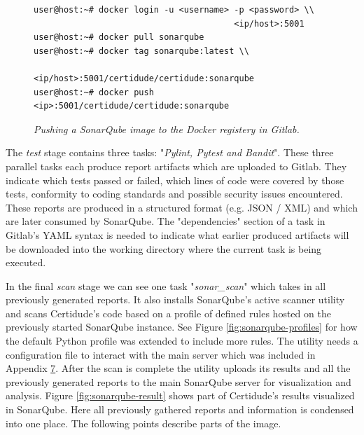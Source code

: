 \pagebreak

\begin{figure}[H]
\centering
\begin{lstlisting}[frame=single, basicstyle=\small, linewidth=\textwidth]
user@host:~# docker login -u <username> -p <password> \\ 
                                        <ip/host>:5001
user@host:~# docker pull sonarqube
user@host:~# docker tag sonarqube:latest \\
                    <ip/host>:5001/certidude/certidude:sonarqube
user@host:~# docker push <ip>:5001/certidude/certidude:sonarqube
\end{lstlisting}
\caption{\textit{Pushing a SonarQube image to the Docker registery in Gitlab.}}
\label{fig:gitlab-sonar-docker}
\end{figure}

The \textit{test} stage contains three tasks: "\textit{Pylint, Pytest and Bandit}". These three parallel tasks each produce report artifacts which are uploaded to Gitlab. They indicate which tests passed or failed, which lines of code were covered by those tests, conformity to coding standards and possible security issues encountered. These reports are produced in a structured format (e.g. JSON / XML) and which are later consumed by SonarQube. The "dependencies" section of a task in Gitlab's YAML syntax is needed to indicate what earlier produced artifacts will be downloaded into the working directory where the current task is being executed.

In the final \textit{scan} stage we can see one task "\textit{sonar\_scan}" which takes in all previously generated reports. It also installs SonarQube's active scanner utility and scans Certidude's code based on a profile of defined rules hosted on the previously started SonarQube instance. See Figure \ref{fig:sonarqube-profiles} for how the default Python profile was extended to include more rules. The utility needs a configuration file to interact with the main server which was included in Appendix \hyperref[chapter:appendix-sonar]{7}. After the scan is complete the utility uploads its results and all the previously generated reports to the main SonarQube server for visualization and analysis. Figure \ref{fig:sonarqube-result} shows part of Certidude's results visualized in SonarQube. Here all previously gathered reports and information is condensed into one place. The following points describe parts of the image.

